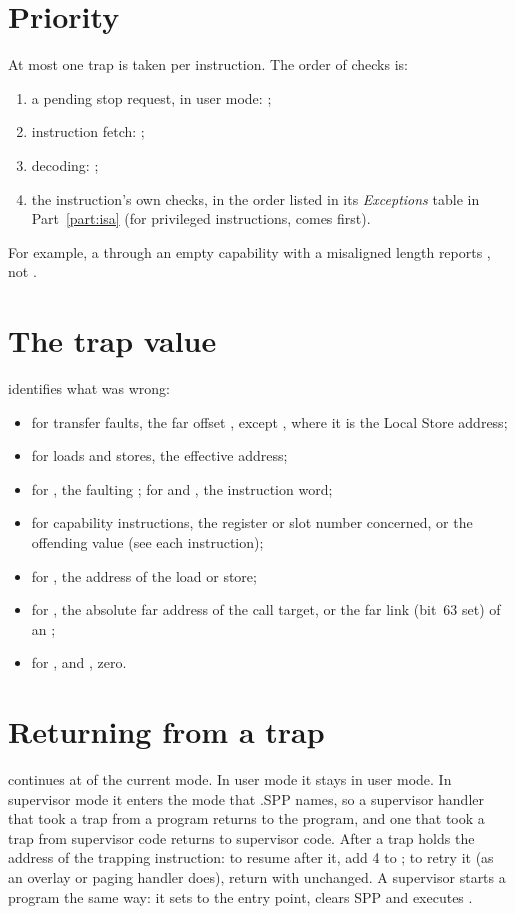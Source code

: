 \section{Priority}

At most one trap is taken per instruction. The order of checks is:
\begin{enumerate}
\item a pending stop request, in user mode: ;
\item instruction fetch: ;
\item decoding: ;
\item the instruction's own checks, in the order listed in its \emph{Exceptions} table in
  Part~\ref{part:isa} (for privileged instructions,  comes first).
\end{enumerate}
For example, a  through an empty capability with a misaligned length reports
, not .

\section{The trap value}

 identifies what was wrong:
\begin{itemize}
\item for transfer faults, the far offset , except , where it is the Local
  Store address;
\item for loads and stores, the effective address;
\item for , the faulting ; for  and , the instruction
  word;
\item for capability instructions, the register or slot number concerned, or the offending value (see each
  instruction);
\item for , the address of the load or store;
\item for , the absolute far address of the call target, or the far link (bit~63 set) of
  an ;
\item for ,  and , zero.
\end{itemize}

\section{Returning from a trap}

 continues at  of the current mode. In user mode it stays in user mode. In
supervisor mode it enters the mode that .SPP names, so a supervisor handler that took a
trap from a program returns to the program, and one that took a trap from supervisor code returns to
supervisor code. After a trap  holds the address of the trapping instruction: to resume after
it, add 4 to ; to retry it (as an overlay or paging handler does), return with 
unchanged. A supervisor starts a program the same way: it sets  to the entry point, clears
SPP and executes .

